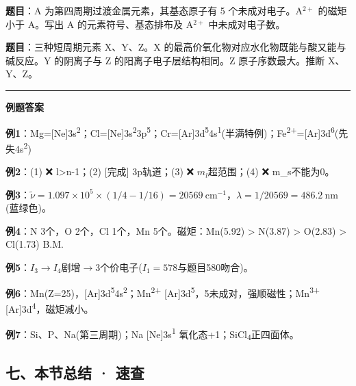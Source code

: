 \documentclass[a4paper,11pt]{ctexart}
\newcommand{\箭}{\ensuremath{\rightarrow}}
\newcommand{\左箭}{\ensuremath{\leftarrow}}
\newcommand{\上箭}{\ensuremath{\uparrow}}
\newcommand{\下箭}{\ensuremath{\downarrow}}
\newcommand{\衡}{\ensuremath{\rightleftharpoons}}
\newcommand{\双箭}{\ensuremath{\leftrightarrow}}
\newcommand{\约等于}{\ensuremath{\approx}}
\newcommand{\小于等于}{\ensuremath{\leq}}
\newcommand{\大于等于}{\ensuremath{\geq}}
\newcommand{\不等于}{\ensuremath{\neq}}
\newcommand{\西格马}{\ensuremath{\sigma}}
\newcommand{\派}{\ensuremath{\pi}}
\begin{document}
\textbf{题目}：A 为第四周期过渡金属元素，其基态原子有 5 个未成对电子。A\(^{2+}\) 的磁矩小于 A。写出 A 的元素符号、基态排布及 A\(^{2+}\) 中未成对电子数。

\textbf{题目}：三种短周期元素 X、Y、Z。X 的最高价氧化物对应水化物既能与酸又能与碱反应。Y 的阴离子与 Z 的阳离子电子层结构相同。Z 原子序数最大。推断 X、Y、Z。

\begin{center}\rule{0.5\linewidth}{0.5pt}\end{center}

\textbf{例题答案}

\textbf{例1}：Mg={[}Ne{]}3s\textsuperscript{2}；Cl={[}Ne{]}3s\textsuperscript{2}3p\textsuperscript{5}；Cr={[}Ar{]}3d\textsuperscript{5}4s\textsuperscript{1}(半满特例)；Fe\textsuperscript{2+}={[}Ar{]}3d\textsuperscript{6}(先失4s\textsuperscript{2})

\textbf{例2}：(1) ❌ l\textgreater n-1；(2) {[}完成{]} 3p轨道；(3) ❌ \(m_l\)超范围；(4) ❌ m\_s不能为0。

\textbf{例3}：\(\tilde{\nu}=1.097\times10^5\times(1/4-1/16)=20569\ \mathrm{cm^{-1}}\)，\(\lambda=1/20569=486.2\ \mathrm{nm}\)(蓝绿色)。

\textbf{例4}：N 3个，O 2个，Cl 1个，Mn 5个。磁矩：Mn(5.92) \textgreater{} N(3.87) \textgreater{} O(2.83) \textgreater{} Cl(1.73) B.M.

\textbf{例5}：\(I_3\to I_4\)剧增\箭3个价电子(\(I_1=578\)与题目580吻合)。

\textbf{例6}：Mn(Z=25)，{[}Ar{]}3d\textsuperscript{5}4s\textsuperscript{2}；Mn\textsuperscript{2+} {[}Ar{]}3d\textsuperscript{5}，5未成对，强顺磁性；Mn\textsuperscript{3+} {[}Ar{]}3d\textsuperscript{4}，磁矩减小。

\textbf{例7}：Si、P、Na(第三周期)；Na {[}Ne{]}3s\textsuperscript{1} 氧化态+1；SiCl\textsubscript{4}正四面体。

\subsection{七、本节总结 · 速查}\label{ux4e03ux672cux8282ux603bux7ed3-ux901fux67e5}
\end{document}
